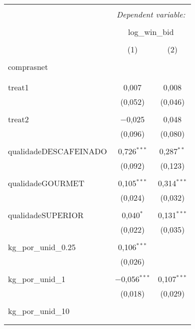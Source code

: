 
\begin{table}[!htbp] \centering 
  \caption{} 
  \label{} 
\begin{tabular}{@{\extracolsep{5pt}}lcc} 
\\[-1.8ex]\hline 
\hline \\[-1.8ex] 
 & \multicolumn{2}{c}{\textit{Dependent variable:}} \\ 
\cline{2-3} 
\\[-1.8ex] & \multicolumn{2}{c}{log\_win\_bid} \\ 
\\[-1.8ex] & (1) & (2)\\ 
\hline \\[-1.8ex] 
 comprasnet &  &  \\ 
  &  &  \\ 
  & & \\ 
 treat1 & 0,007 & 0,008 \\ 
  & (0,052) & (0,046) \\ 
  & & \\ 
 treat2 & $-$0,025 & 0,048 \\ 
  & (0,096) & (0,080) \\ 
  & & \\ 
 qualidadeDESCAFEINADO & 0,726$^{***}$ & 0,287$^{**}$ \\ 
  & (0,092) & (0,123) \\ 
  & & \\ 
 qualidadeGOURMET & 0,105$^{***}$ & 0,314$^{***}$ \\ 
  & (0,024) & (0,032) \\ 
  & & \\ 
 qualidadeSUPERIOR & 0,040$^{*}$ & 0,131$^{***}$ \\ 
  & (0,022) & (0,035) \\ 
  & & \\ 
 kg\_por\_unid\_0.25 & 0,106$^{***}$ &  \\ 
  & (0,026) &  \\ 
  & & \\ 
 kg\_por\_unid\_1 & $-$0,056$^{***}$ & 0,107$^{***}$ \\ 
  & (0,018) & (0,029) \\ 
  & & \\ 
 kg\_por\_unid\_10 &  &  \\ 
  &  &  \\ 
  & & \\ 

\end{tabular}
\end{table}
